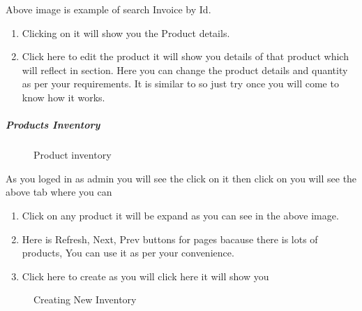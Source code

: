 \documentclass[a4paper,10pt,english]{report}
\begin{document}
Above image is example of search Invoice by Id.
\begin{enumerate}
\def\theenumi{\arabic{enumi}}
\def\labelenumi{\theenumi .}
\makeatletter\def\p@enumii{\p@enumi \theenumi .}\makeatother
\setcounter{enumi}{1}
\item {} 
Clicking on it will show you the Product details.

\item {} 
Click here to edit the product it will show you details of that product which will reflect in  section. Here you can change the product details and quantity as per your requirements. It is similar to {\hyperref[\detokenize{listing:edit-product}]{}} so just try once you will come to know how it works.

\end{enumerate}


\subparagraph{Products Inventory}
\label{\detokenize{prodinventory:products-inventory}}\label{\detokenize{prodinventory::doc}}
\begin{figure}[htbp]
\centering
\capstart

\noindent{}
\caption{Product inventory}\label{\detokenize{prodinventory:id9}}\label{\detokenize{prodinventory:id1}}\end{figure}

As you loged in as admin you will see the  click on it then click on  you will see the above tab
where you can
\begin{enumerate}
\def\theenumi{\arabic{enumi}}
\def\labelenumi{\theenumi .}
\makeatletter\def\p@enumii{\p@enumi \theenumi .}\makeatother
\item {} 
Click on any product it will be expand as you can see in the above image.

\item {} 
Here is Refresh, Next, Prev buttons for pages bacause there is lots of products, You can use it as per your convenience.

\item {} 
Click here to create  as you will click here it will show you

\end{enumerate}

\begin{figure}[htbp]
\centering
\capstart

\noindent{}
\caption{Creating New Inventory}\label{\detokenize{prodinventory:id10}}\label{\detokenize{prodinventory:id2}}\end{figure}
\end{document}
